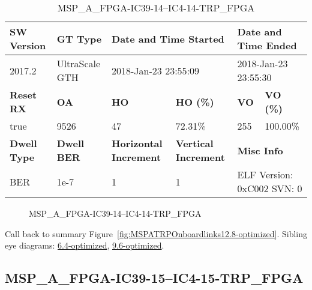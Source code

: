 \begin{table}[h]
\centering
\caption{MSP\_A\_FPGA-IC39-14--IC4-14-TRP\_FPGA}
\label{tab:MSPAFPGAIC3914IC414TRPFPGA12.8-optimized}
\begin{tabular}{@{}|l|l|l|l|l|l|@{}}
\toprule
\textbf{SW Version}                & \textbf{GT Type}   & \multicolumn{2}{l|}{\textbf{Date and Time Started}}            & \multicolumn{2}{l|}{\textbf{Date and Time Ended}}        \\ \midrule
2017.2                       & UltraScale GTH          & \multicolumn{2}{l|}{2018-Jan-23 23:55:09}                   & \multicolumn{2}{l|}{2018-Jan-23 23:55:30}               \\ \midrule
\textbf{Reset RX}                  & \textbf{OA} & \textbf{HO}   & \textbf{HO (\%)} & \textbf{VO} & \textbf{VO (\%)} \\ \midrule
true & 9526        & 47          & 72.31\%        & 255        & 100.00\%       \\ \midrule
\textbf{Dwell Type}                & \textbf{Dwell BER} & \textbf{Horizontal Increment} & \textbf{Vertical Increment}    & \multicolumn{2}{l|}{\textbf{Misc Info}}                  \\ \midrule
BER                            & 1e-7        & 1        & 1           & \multicolumn{2}{l|}{ELF Version: 0xC002 SVN: 0}                         \\ \bottomrule
\end{tabular}
\end{table}

\begin{figure}[h]
\caption{MSP\_A\_FPGA-IC39-14--IC4-14-TRP\_FPGA} \label{fig:MSPAFPGAIC3914IC414TRPFPGA12.8-optimized}
\end{figure}

Call back to summary Figure~\ref{fig:MSPATRPOnboardlinks12.8-optimized}.
Sibling eye diagrams: \hyperref[sec:MSPAFPGAIC3914IC414TRPFPGA6.4-optimized]{6.4-optimized}, \hyperref[sec:MSPAFPGAIC3914IC414TRPFPGA9.6-optimized]{9.6-optimized}.

\clearpage
\newpage


\subsection{MSP\_A\_FPGA-IC39-15--IC4-15-TRP\_FPGA}\label{sec:MSPAFPGAIC3915IC415TRPFPGA12.8-optimized}

